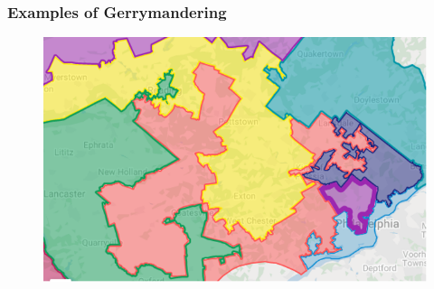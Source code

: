 \documentclass[red]{beamer}
\begin{document}
    \begin{frame} [t]
    \frametitle{Examples of Gerrymandering}
    \begin{figure}[h]
    \begin{center}
    \includegraphics[scale=0.75]{PA_small.png}
    \label{fig:PA_small}
    \end{center}
    \end{figure}  
    \end{frame}
    
\end{document}

